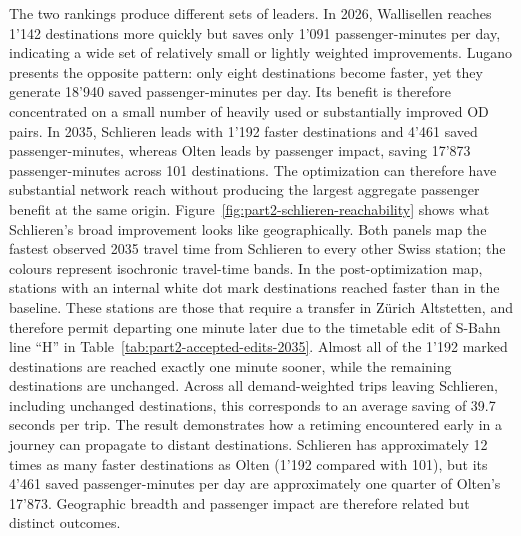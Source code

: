 \documentclass[preprint,12pt]{elsarticle}
\begin{document}
The two rankings produce different sets of leaders. In 2026, Wallisellen reaches 1'142 destinations more quickly but saves only 1'091 passenger-minutes per day, indicating a wide set of relatively small or lightly weighted improvements. Lugano presents the opposite pattern: only eight destinations become faster, yet they generate 18'940 saved passenger-minutes per day. Its benefit is therefore concentrated on a small number of heavily used or substantially improved OD pairs. In 2035, Schlieren leads with 1'192 faster destinations and 4'461 saved passenger-minutes, whereas Olten leads by passenger impact, saving 17'873 passenger-minutes across 101 destinations. The optimization can therefore have substantial network reach without producing the largest aggregate passenger benefit at the same origin. Figure~\ref{fig:part2-schlieren-reachability} shows what Schlieren's broad improvement looks like geographically. Both panels map the fastest observed 2035 travel time from Schlieren to every other Swiss station; the colours represent isochronic travel-time bands. In the post-optimization map, stations with an internal white dot mark destinations reached faster than in the baseline. These stations are those that require a transfer in Zürich Altstetten, and therefore permit departing one minute later due to the timetable edit of S-Bahn line ``H'' in Table~\ref{tab:part2-accepted-edits-2035}. Almost all of the 1'192 marked destinations are reached exactly one minute sooner, while the remaining destinations are unchanged. Across all demand-weighted trips leaving Schlieren, including unchanged destinations, this corresponds to an average saving of 39.7 seconds per trip. The result demonstrates how a retiming encountered early in a journey can propagate to distant destinations. Schlieren has approximately 12 times as many faster destinations as Olten (1'192 compared with 101), but its 4'461 saved passenger-minutes per day are approximately one quarter of Olten's 17'873. Geographic breadth and passenger impact are therefore related but distinct outcomes.
\end{document}
